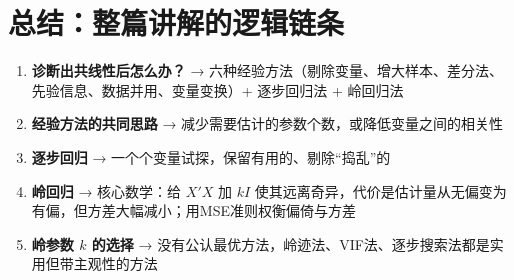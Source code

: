 \documentclass[12pt,a4paper]{ctexart}
\begin{document}
\section*{总结：整篇讲解的逻辑链条}

\begin{enumerate}
\item \textbf{诊断出共线性后怎么办？} → 六种经验方法（剔除变量、增大样本、差分法、先验信息、数据并用、变量变换）+ 逐步回归法 + 岭回归法
\item \textbf{经验方法的共同思路} → 减少需要估计的参数个数，或降低变量之间的相关性
\item \textbf{逐步回归} → 一个个变量试探，保留有用的、剔除“捣乱”的
\item \textbf{岭回归} → 核心数学：给 $X'X$ 加 $kI$ 使其远离奇异，代价是估计量从无偏变为有偏，但方差大幅减小；用MSE准则权衡偏倚与方差
\item \textbf{岭参数 $k$ 的选择} → 没有公认最优方法，岭迹法、VIF法、逐步搜索法都是实用但带主观性的方法
\end{enumerate}
\end{document}
